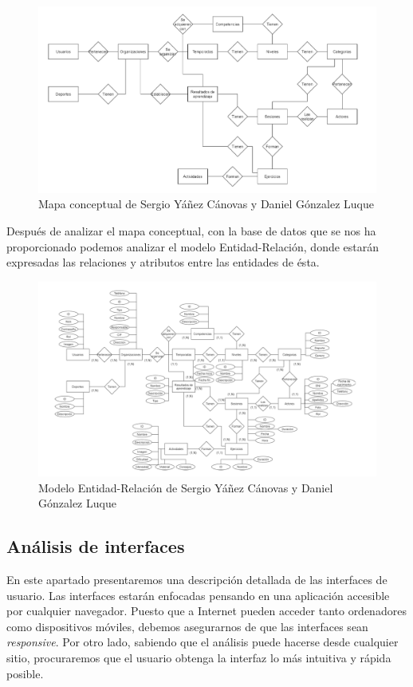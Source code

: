 \begin{figure}[H]
    \centering
    \includegraphics[width=15cm]{archivos/tfg_jorge/esquema_conceptual_Sergio}
    \caption{Mapa conceptual de Sergio Yáñez Cánovas y Daniel Gónzalez Luque}\label{sistemass2}
\end{figure}

Después de analizar el mapa conceptual, con la base de datos que se nos ha proporcionado podemos analizar el modelo Entidad-Relación, donde estarán expresadas las relaciones y atributos entre las entidades de ésta.

\begin{figure}[H]
    \centering
    \includegraphics[width=15cm]{archivos/tfg_jorge/esquema_entidad_rel_Sergio}
    \caption{Modelo Entidad-Relación de Sergio Yáñez Cánovas y Daniel Gónzalez Luque}\label{sistemass2}
\end{figure}

\subsection{Análisis de interfaces}
\label{subsec:int_analysis}
En este apartado presentaremos una descripción detallada de las interfaces de usuario. Las interfaces estarán enfocadas pensando en una aplicación accesible por cualquier navegador. Puesto que a Internet pueden acceder tanto ordenadores como dispositivos móviles, debemos asegurarnos de que las interfaces sean \textit{responsive}.
Por otro lado, sabiendo que el análisis puede hacerse desde cualquier sitio, procuraremos que el usuario obtenga la interfaz lo más intuitiva y rápida posible.

